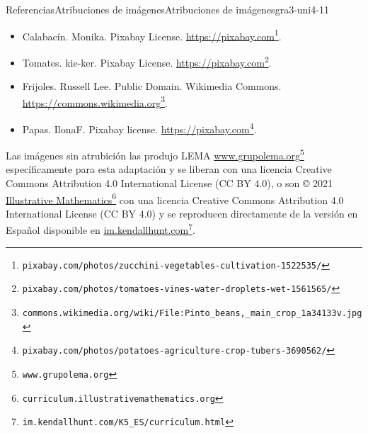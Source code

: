 \documentclass[oneside,10pt,]{article}
\begin{document}
\begin{references-section}{Referencias}{Atribuciones de imágenes}{}{Atribuciones de imágenes}{}{}{gra3-uni4-11}
\begin{itemize}[label=\textbullet]
\begin{itemize}[label=$\circ$]
\item{}Calabacín. Monika. Pixabay License. \href{https://pixabay.com/photos/zucchini-vegetables-cultivation-1522535/}{https:\slash{}\slash{}pixabay.com}\footnote{\nolinkurl{pixabay.com/photos/zucchini-vegetables-cultivation-1522535/}\label{gra3-uni4-11-2-9-2-3-1-2}}.%
\item{}Tomates. kie-ker. Pixabay License. \href{https://pixabay.com/photos/tomatoes-vines-water-droplets-wet-1561565/}{https:\slash{}\slash{}pixabay.com}\footnote{\nolinkurl{pixabay.com/photos/tomatoes-vines-water-droplets-wet-1561565/}\label{gra3-uni4-11-2-9-2-4-1-2}}.%
\item{}Frijoles. Russell Lee. Public Domain. Wikimedia Commons. \href{https://commons.wikimedia.org/wiki/File:Pinto_beans,_main_crop_1a34133v.jpg}{https:\slash{}\slash{}commons.wikimedia.org}\footnote{\nolinkurl{commons.wikimedia.org/wiki/File:Pinto_beans,_main_crop_1a34133v.jpg}\label{gra3-uni4-11-2-9-2-5-1-2}}.%
\item{}Papas. IlonaF. Pixabay license. \href{https://pixabay.com/photos/potatoes-agriculture-crop-tubers-3690562/}{https:\slash{}\slash{}pixabay.com}\footnote{\nolinkurl{pixabay.com/photos/potatoes-agriculture-crop-tubers-3690562/}\label{gra3-uni4-11-2-9-2-6-1-2}}.%
\end{itemize}
\end{itemize}
Las imágenes sin atrubición las produjo LEMA \href{https://www.grupolema.org}{www.grupolema.org}\footnote{\nolinkurl{www.grupolema.org}\label{gra3-uni4-11-3-2}} específicamente para esta adaptación y se liberan con una licencia Creative Commons Attribution 4.0 International License (CC BY 4.0), o son © 2021 \href{https://curriculum.illustrativemathematics.org}{Illustrative Mathematics}\footnote{\nolinkurl{curriculum.illustrativemathematics.org}\label{gra3-uni4-11-3-4}} con una licencia Creative Commons Attribution 4.0 International License (CC BY 4.0) y se reproducen directamente de la versión en Español disponible en \href{https://im.kendallhunt.com/K5_ES/curriculum.html}{im.kendallhunt.com}\footnote{\nolinkurl{im.kendallhunt.com/K5_ES/curriculum.html}\label{gra3-uni4-11-3-6}}.%
\end{references-section}
\end{document}
